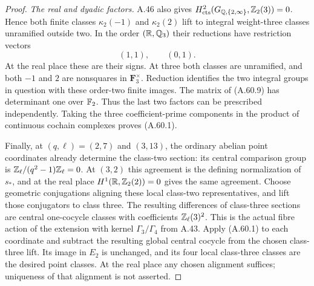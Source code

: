 \begin{proof}
\emph{The real and dyadic factors.}
A.46 also gives
$H^2_{\rm cts}(G_{\mathbb Q,\{2,\infty\}},\mathbb Z_2(3))=0$.
Hence both finite classes $\kappa_2(-1)$ and
$\kappa_2(2)$ lift to integral weight-three classes
unramified outside two.  In the order
$(\mathbb R,\mathbb Q_3)$ their reductions have restriction vectors
\[
                         (1,1),\qquad(0,1).
 \tag{A.60.9}
\]
At the real place these are their signs.  At three
both classes are unramified, and both $-1$ and $2$
are nonsquares in $\mathbf F_3^\times$.
Reduction identifies the two integral groups in question
with these order-two finite images.  The matrix of
(A.60.9) has determinant one over $\mathbb F_2$.
Thus the last two factors can be prescribed independently.
Taking the three coefficient-prime components in the
product of continuous cochain complexes proves (A.60.1).

Finally, at $(q,\ell)=(2,7)$ and $(3,13)$, the
ordinary abelian point coordinates already determine the
class-two section: its central comparison group is
$\mathbb Z_\ell/(q^2-1)\mathbb Z_\ell=0$.
At $(3,2)$ this agreement is the defining normalization
of $s_*$, and at the real place
$H^1(\mathbb R,\mathbb Z_2(2))=0$ gives the same agreement.
Choose geometric conjugations aligning these local
class-two representatives, and lift those conjugators
to class three.  The resulting differences of class-three
sections are central one-cocycle classes with coefficients
$\mathbb Z_\ell(3)^2$.  This is the actual fibre action of the
extension with kernel $\Gamma_3/\Gamma_4$ from A.43.
Apply (A.60.1) to each coordinate and subtract the
resulting global central cocycle from the chosen
class-three lift.  Its image in $E_2$ is unchanged,
and its four local class-three classes are the desired
point classes.  At the real place any chosen alignment
suffices; uniqueness of that alignment is not asserted.
\end{proof}
